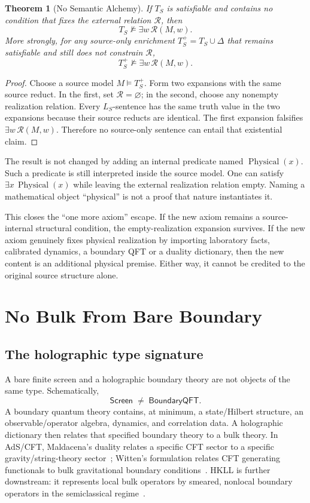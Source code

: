 \documentclass[10pt,a4paper]{article}
\newtheorem{theorem}{Theorem}[section]
\theoremstyle{definition}
\theoremstyle{remark}
\newcommand{\notmodels}{\mathrel{\not\models}}
\begin{document}
\begin{theorem}[No Semantic Alchemy]
\label{thm:alchemy}
If \(T_S\) is satisfiable and contains no condition that fixes the external
relation \(\mathcal R\), then
\[
T_S\notmodels \exists w\,\mathcal R(M,w).
\]
More strongly, for any source-only enrichment \(T_S^+=T_S\cup\Delta\) that
remains satisfiable and still does not constrain \(\mathcal R\),
\[
T_S^+\notmodels \exists w\,\mathcal R(M,w).
\]
\end{theorem}

\begin{proof}
Choose a source model \(M\models T_S^+\).  Form two expansions with the same
source reduct.  In the first, set \(\mathcal R=\varnothing\); in the second,
choose any nonempty realization relation.  Every \(L_S\)-sentence has the
same truth value in the two expansions because their source reducts are
identical.  The first expansion falsifies \(\exists w\,\mathcal R(M,w)\).
Therefore no source-only sentence can entail that existential claim.
\end{proof}

The result is not changed by adding an internal predicate named
\(\operatorname{Physical}(x)\).  Such a predicate is still interpreted inside
the source model.  One can satisfy \(\exists x\,\operatorname{Physical}(x)\)
while leaving the external realization relation empty.  Naming a mathematical
object ``physical'' is not a proof that nature instantiates it.

This closes the ``one more axiom'' escape.  If the new axiom remains a source-
internal structural condition, the empty-realization expansion survives.  If
the new axiom genuinely fixes physical realization by importing laboratory
facts, calibrated dynamics, a boundary QFT or a duality dictionary, then the
new content is an additional physical premise.  Either way, it cannot be
credited to the original source structure alone.

\section{No Bulk From Bare Boundary}
\label{sec:nobulk}

\subsection{The holographic type signature}

A bare finite screen and a holographic boundary theory are not objects of the
same type.  Schematically,
\[
\mathsf{Screen}
\;\not=\;
\mathsf{BoundaryQFT}.
\]
A boundary quantum theory contains, at minimum, a state/Hilbert structure,
an observable/operator algebra, dynamics, and correlation data.  A
holographic dictionary then relates that specified boundary theory to a bulk
theory.  In AdS/CFT, Maldacena's duality relates a specific CFT sector to a
specific gravity/string-theory sector~\cite{Maldacena1997}; Witten's
formulation relates CFT generating functionals to bulk gravitational boundary
conditions~\cite{Witten1998}.  HKLL is further downstream: it represents local
bulk operators by smeared, nonlocal boundary operators in the semiclassical
regime~\cite{HKLL2006}.
\end{document}
